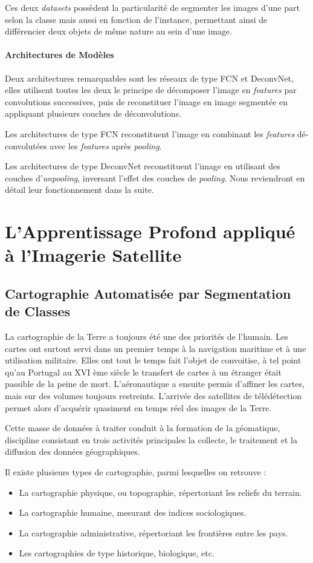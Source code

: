 \documentclass[a4paper, 11pt]{report}
\begin{document}
Ces deux \emph{datasets} possèdent la particularité de segmenter les images d'une part selon la classe mais aussi en fonction de l'instance, permettant ainsi de différencier deux objets de même nature au sein d'une image.
\subsubsection{Architectures de Modèles}
Deux architectures remarquables sont les réseaux de type FCN et DeconvNet, elles utilisent toutes les deux le principe de décomposer l'image en \emph{features} par convolutions successives, puis de reconstituer l'image en image segmentée en appliquant plusieurs couches de déconvolutions.

Les architectures de type FCN reconstituent l'image en combinant les \emph{features} dé-convolutées avec les \emph{features} après \emph{pooling}.

Les architectures de type DeconvNet reconstituent l'image en utilisant des couches d'\emph{unpooling}, inversant l'effet des couches de \emph{pooling}. Nous reviendront en détail leur fonctionnement dans la suite.
\chapter{L'Apprentissage Profond appliqué à l'Imagerie Satellite}
\section{Cartographie Automatisée par Segmentation de Classes}
La cartographie de la Terre a toujours été une des priorités de l'humain.
Les cartes ont surtout servi dans un premier temps à la navigation maritime et à une utilisation militaire. Elles ont tout le temps fait l'objet de convoitise, à tel point qu'au Portugal au XVI ème siècle le transfert de cartes à un étranger était passible de la peine de mort. L'aéronautique a ensuite permis d'affiner les cartes, mais sur des volumes toujours restreints. L'arrivée des satellites de télédétection permet alors d'acquérir quasiment en temps réel des images de la Terre.

Cette masse de données à traiter conduit à la formation de la géomatique, discipline consistant en trois activités principales la collecte, le traitement et la diffusion des données géographiques.

Il existe plusieurs types de cartographie, parmi lesquelles on retrouve :
\begin{itemize}
	\item La cartographie physique, ou topographie, répertoriant les reliefs du terrain.
	\item La cartographie humaine, mesurant des indices sociologiques.
	\item La cartographie administrative, répertoriant les frontières entre les pays.
	\item Les cartographies de type historique, biologique, etc.
\end{itemize}
\end{document}
